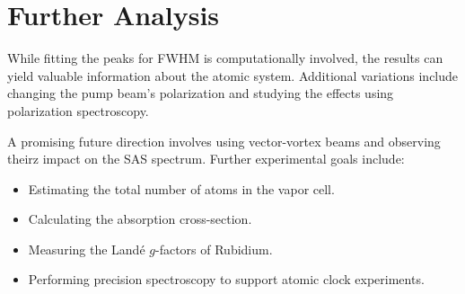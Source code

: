 \documentclass[a4paper, 12pt]{article}
\begin{document}
\newpage

\section{Further Analysis}
While fitting the peaks for FWHM is computationally involved, the results can yield valuable information about the atomic system. Additional variations include changing the pump beam’s polarization and studying the effects using polarization spectroscopy.

A promising future direction involves using vector-vortex beams and observing theirz impact on the SAS spectrum. Further experimental goals include:
\begin{itemize}
    \item Estimating the total number of atoms in the vapor cell.
    \item Calculating the absorption cross-section.
    \item Measuring the Landé $g$-factors of Rubidium.
    \item Performing precision spectroscopy to support atomic clock experiments.
\end{itemize}
\end{document}
